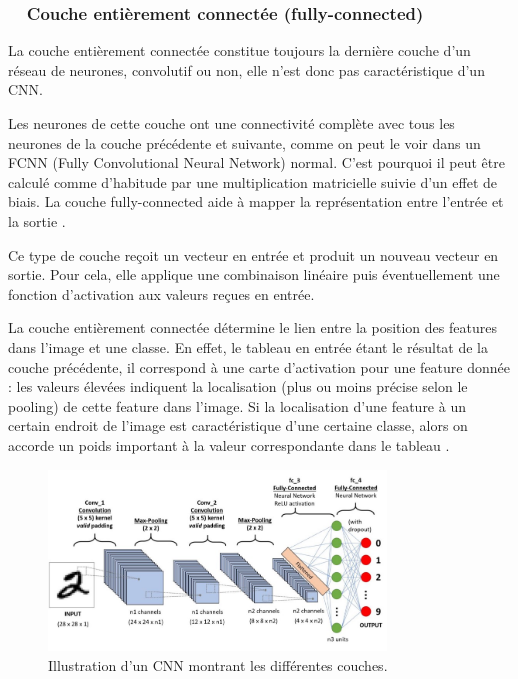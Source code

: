 \subsubsection*{\qquad \textbullet \ \ Couche entièrement connectée (fully-connected)}

La couche entièrement connectée constitue toujours la dernière couche d'un réseau de neurones, convolutif ou non, elle n'est donc pas caractéristique d'un CNN. 

Les neurones de cette couche ont une connectivité complète avec tous les neurones de la couche précédente et suivante, comme on peut le voir dans un FCNN (Fully Convolutional Neural Network) normal. C'est pourquoi il peut être calculé comme d'habitude par une multiplication matricielle suivie d'un effet de biais. La couche fully-connected aide à mapper la représentation entre l'entrée et la sortie \cite{goodfellow2016deep}.

Ce type de couche reçoit un vecteur en entrée et produit un nouveau vecteur en sortie. Pour cela, elle applique une combinaison linéaire puis éventuellement une fonction d'activation aux valeurs reçues en entrée.

La couche entièrement connectée détermine le lien entre la position des features dans l'image et une classe. En effet, le tableau en entrée étant le résultat de la couche précédente, il correspond à une carte d'activation pour une feature donnée : les valeurs élevées indiquent la localisation (plus ou moins précise selon le pooling) de cette feature dans l'image. Si la localisation d'une feature à un certain endroit de l'image est caractéristique d'une certaine classe, alors on accorde un poids important à la valeur correspondante dans le tableau \cite{shin2016deep}.

\begin{figure}[H]%
	\centering
	\includegraphics[width=0.8\textwidth]{images/cnn_image1}
	\caption{Illustration d'un CNN montrant les différentes couches.}
	\label{fig:cnn_}
\end{figure}






